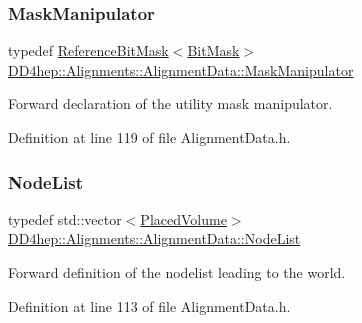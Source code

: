 \hypertarget{class_d_d4hep_1_1_alignments_1_1_alignment_data_a7eb85e9201294a4ae7a3c5fe6d913233}{}\label{class_d_d4hep_1_1_alignments_1_1_alignment_data_a7eb85e9201294a4ae7a3c5fe6d913233} 
\subsubsection{\texorpdfstring{Mask\+Manipulator}{MaskManipulator}}
{\footnotesize\ttfamily typedef \hyperlink{class_d_d4hep_1_1_reference_bit_mask}{Reference\+Bit\+Mask}$<$\hyperlink{class_d_d4hep_1_1_alignments_1_1_alignment_data_ab5c31f7e5512ca675be8323bc723b123}{Bit\+Mask}$>$ \hyperlink{class_d_d4hep_1_1_alignments_1_1_alignment_data_a7eb85e9201294a4ae7a3c5fe6d913233}{D\+D4hep\+::\+Alignments\+::\+Alignment\+Data\+::\+Mask\+Manipulator}}



Forward declaration of the utility mask manipulator. 



Definition at line 119 of file Alignment\+Data.\+h.

\hypertarget{class_d_d4hep_1_1_alignments_1_1_alignment_data_a3a667fd798d7523d75accee832d64521}{}\label{class_d_d4hep_1_1_alignments_1_1_alignment_data_a3a667fd798d7523d75accee832d64521} 
\subsubsection{\texorpdfstring{Node\+List}{NodeList}}
{\footnotesize\ttfamily typedef std\+::vector$<$\hyperlink{class_d_d4hep_1_1_alignments_1_1_alignment_data_aab2d43f5a4a4c2163e0a04905306525a}{Placed\+Volume}$>$ \hyperlink{class_d_d4hep_1_1_alignments_1_1_alignment_data_a3a667fd798d7523d75accee832d64521}{D\+D4hep\+::\+Alignments\+::\+Alignment\+Data\+::\+Node\+List}}



Forward definition of the nodelist leading to the world. 



Definition at line 113 of file Alignment\+Data.\+h.

